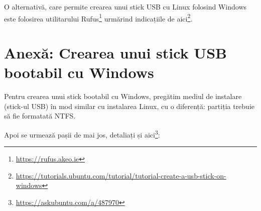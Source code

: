 O alternativă, care permite crearea unui stick USB cu Linux folosind Windows
este folosirea utilitarului Rufus\footnote{\url{https://rufus.akeo.ie}} urmărind
indicațiile de
aici\footnote{\url{https://tutorials.ubuntu.com/tutorial/tutorial-create-a-usb-stick-on-windows}}.

\section{Anexă: Crearea unui stick USB bootabil cu Windows}
\label{sec:boot-usb-win}

Pentru crearea unui stick bootabil cu Windows, pregătim mediul de instalare
(stick-ul USB) în mod similar cu instalarea Linux, cu o diferență: partiția
trebuie să fie formatată NTFS.

Apoi se urmează pașii de mai jos, detaliați și
aici\footnote{\url{https://askubuntu.com/a/487970}}:

